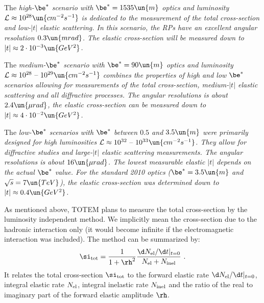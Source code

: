 \> The \em{high-$\be^*$} scenario with $\be^* = 1535\un{m}$ optics and luminosity ${\cal L} \approx 10^{28} \un{cm^{-2}s^{-1}}$ is dedicated to the measurement of the total cross-section and low-$|t|$ elastic scattering. In this scenario, the RPs have an excellent angular resolution $0.3\un{mrad}$. The elastic cross-section will be measured down to $|t| \approx 2\cdot10^{-3}\un{GeV^2}$.

\> The \em{medium-$\be^*$} scenario with $\be^* = 90\un{m}$ optics and luminosity ${\cal L} \approx 10^{28} \hbox{ -- } 10^{29}\un{cm^{-2}s^{-1}}$ combines the properties of high and low $\be^*$ scenarios allowing for measurements of the total cross-section, medium-$|t|$ elastic scattering and all diffractive processes. The angular resolutions is about $2.4\un{\mu rad}$, the elastic cross-section can be measured down to $|t| \approx 4\cdot 10^{-2}\un{GeV^2}$.

\> The \em{low-$\be^*$} scenarios with $\be^*$ between $0.5$ and $3.5\un{m}$ were primarily designed for high luminosities ${\cal L} \approx 10^{32} \hbox{ -- } 10^{33}\un{cm^{-2}s^{-1}}$. They allow for diffractive studies and large-$|t|$ elastic scattering measurements. The angular resolutions is about $16\un{\mu rad}$. The lowest measurable elastic $|t|$ depends on the actual $\be^*$ value. For the standard 2010 optics ($\be^* = 3.5\un{m}$ and $\sqrt s = 7\un{TeV}$), the elastic cross-section was determined down to $|t| \approx 0.4\un{GeV^2}$.

\vskip1mm
As mentioned above, TOTEM plans to measure the total cross-section by the luminosity independent method. We implicitly mean the cross-section due to the hadronic interaction only (it would become infinite if the electromagnetic interaction was included). The method can be summarized by:
$$
	\si_{\rm tot} = {1\over 1+\rh^2} {\d N_{\rm el}/\d t|_{t=0}\over N_{\rm el} + N_{\rm inel}}\ .
$$
It relates the total cross-section $\si_{\rm tot}$ to the forward elastic rate $\d N_{\rm el}/\d t|_{t=0}$, integral elastic rate $N_{\rm el}$, integral inelastic rate $N_{\rm inel}$ and the ratio of the real to imaginary part of the forward elastic amplitude $\rh$.


